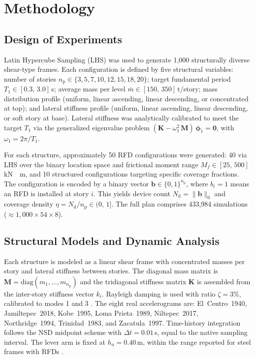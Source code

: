 \documentclass[preprint,12pt,authoryear]{elsarticle}
\newcommand{\nd}{N_{\mathrm{d}}}
\newcommand{\np}{n_{\mathrm{p}}}              %
\newcommand{\etad}{\eta}
\newcommand{\Mf}{M_{\!f}}
\newcommand{\ha}{h_a}
\newcommand{\KM}{\,\si{kN{\cdot}m}}
\begin{document}
\section{Methodology}
\label{sec:method}

\subsection{Design of Experiments}
\label{sec:method:doe}

Latin Hypercube Sampling (LHS) \citep{McKay1979} was used to generate 1,000
structurally diverse shear-type frames. Each configuration is defined by five
structural variables: number of stories $\np \in \{3, 5, 7, 10, 12, 15, 18, 20\}$;
target fundamental period $T_1 \in [0.3,\,3.0]$\,s; average mass per level
$\bar{m} \in [150,\,350]$\,t/story; mass distribution profile (uniform, linear
ascending, linear descending, or concentrated at top); and lateral stiffness profile
(uniform, linear ascending, linear descending, or soft story at base). Lateral stiffness
was analytically calibrated to meet the target $T_1$ via the generalized eigenvalue
problem $(\bm{K} - \omega_1^2\,\bm{M})\,\bm{\phi}_1 = \bm{0}$, with $\omega_1 = 2\pi/T_1$.

For each structure, approximately 50 RFD configurations were generated: 40 via LHS over
the binary location space and frictional moment range $\Mf \in [25,\,500]$\KM, and 10
structured configurations targeting specific coverage fractions. The configuration is
encoded by a binary vector $\bm{b} \in \{0,1\}^{\np}$, where $b_i = 1$ means an RFD is
installed at story $i$. This yields device count $\nd = \|\bm{b}\|_0$ and coverage density
$\etad = \nd/\np \in (0,\,1]$. The full plan comprises 433,984 simulations
($\approx 1,000 \times 54 \times 8$).

\subsection{Structural Models and Dynamic Analysis}
\label{sec:method:modelo}

Each structure is modeled as a linear shear frame with concentrated masses per story and
lateral stiffness between stories. The diagonal mass matrix is
$\bm{M} = \mathrm{diag}(m_1,\ldots,m_{\np})$ and the tridiagonal stiffness matrix
$\bm{K}$ is assembled from the inter-story stiffness vector $k_i$. Rayleigh damping
is used with ratio $\zeta = 3\%$, calibrated to modes 1 and 3
\citep{chopra_dynamics_2015}. The eight real accelerograms are: El~Centro~1940,
Jamiltepec~2018, Kobe~1995, Loma Prieta~1989, Niltepec~2017, Northridge~1994,
Trinidad~1983, and Zacatula~1997. Time-history integration follows the NSD midpoint
scheme \citep{Namorado2024} with $\Delta t = 0.01$\,s, equal to the native sampling
interval. The lever arm is fixed at $\ha = 0.40$\,m, within the range reported for
steel frames with RFDs \citep{Mualla2002, Jarrahi2020jbe}.
\end{document}
